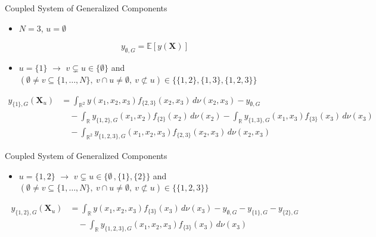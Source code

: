 \begin{frame}{Coupled System of Generalized Components}
    \begin{itemize}
    \item $N = 3$, $u = \emptyset$
  \end{itemize}
    \begin{equation*}
    y_{\emptyset,G} = \mathbb{E}[y(\boldsymbol{X})]
    \end{equation*}
    \begin{itemize}
      \item \textcolor{pastelRedDark}{$u = \{1\}$ $\rightarrow$ $v \subsetneq u \in \{\emptyset\}$} and \textcolor{pastelBlueDark}{$(\emptyset \ne v \subseteq \{1,\dots,N\},\ v \cap u \ne \emptyset,\ v \not\subset u) \in \{\{1,2\}, \{1,3\}, \{1,2,3\}\}$}
    \end{itemize}
    \begin{align*}
       y_{{\{1\}},G}(\boldsymbol{X}_u) &= \int_{\mathbb{R}^{2}} y(x_1, x_2, x_3) f_{{\{2, 3\}}}(x_2, x_3) \, d \nu(x_2, x_3) - y_{\emptyset,G} \\[1em]
    &\quad - \int_{\mathbb{R}}y_{{\{1, 2\}}, G}(x_1, x_2)f_{{\{2\}}}(x_2) \, d \nu(x_2) - \int_{\mathbb{R}}y_{{\{1, 3\}}, G}(x_1, x_3)f_{{\{3\}}}(x_3) \, d \nu(x_3) \\[1em]
    &\quad - \int_{\mathbb{R}^2}y_{{\{1, 2, 3\}}, G}(x_1, x_2, x_3)f_{{\{2, 3\}}}(x_2, x_3) \, d \nu(x_2, x_3)
    \end{align*}
\end{frame}


\begin{frame}{Coupled System of Generalized Components}
      \begin{itemize}
      \item \textcolor{pastelRedDark}{$u = \{1, 2\}$ $\rightarrow$ $v \subsetneq u \in \{\emptyset\,, \{1\}, \{2\}\}$} and \textcolor{pastelBlueDark}{$(\emptyset \ne v \subseteq \{1,\dots,N\},\ v \cap u \ne \emptyset,\ v \not\subset u) \in \{\{1,2,3\}\}$}
    \end{itemize}
    \begin{align*}
       y_{{\{1, 2\}},G}(\boldsymbol{X}_u) &= \int_{\mathbb{R}} y(x_1, x_2, x_3) f_{{\{3\}}}(x_3) \, d \nu(x_3) - y_{\emptyset,G} - y_{{\{1\}},G} - y_{{\{2\}},G}\\[1em]
    &\quad - \int_{\mathbb{R}}y_{{\{1, 2, 3\}}, G}(x_1, x_2, x_3)f_{{\{3\}}}(x_3) \, d \nu(x_3)
    \end{align*}
\end{frame}


